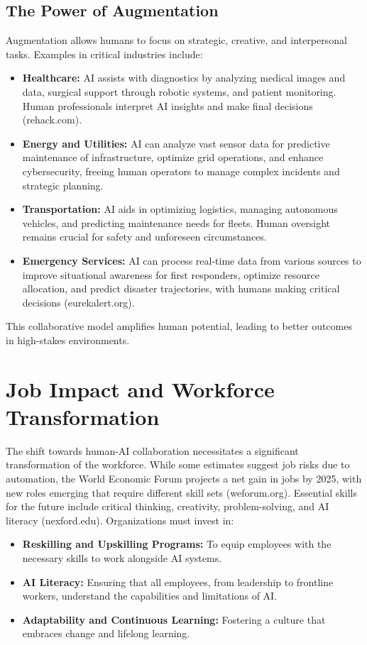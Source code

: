 \subsection{The Power of Augmentation}
Augmentation allows humans to focus on strategic, creative, and interpersonal tasks. Examples in critical industries include:
\begin{itemize}
    \item \textbf{Healthcare:} AI assists with diagnostics by analyzing medical images and data, surgical support through robotic systems, and patient monitoring. Human professionals interpret AI insights and make final decisions (rehack.com).
    \item \textbf{Energy and Utilities:} AI can analyze vast sensor data for predictive maintenance of infrastructure, optimize grid operations, and enhance cybersecurity, freeing human operators to manage complex incidents and strategic planning.
    \item \textbf{Transportation:} AI aids in optimizing logistics, managing autonomous vehicles, and predicting maintenance needs for fleets. Human oversight remains crucial for safety and unforeseen circumstances.
    \item \textbf{Emergency Services:} AI can process real-time data from various sources to improve situational awareness for first responders, optimize resource allocation, and predict disaster trajectories, with humans making critical decisions (eurekalert.org).
\end{itemize}
This collaborative model amplifies human potential, leading to better outcomes in high-stakes environments.

\section{Job Impact and Workforce Transformation}
The shift towards human-AI collaboration necessitates a significant transformation of the workforce. While some estimates suggest job risks due to automation, the World Economic Forum projects a net gain in jobs by 2025, with new roles emerging that require different skill sets (weforum.org). Essential skills for the future include critical thinking, creativity, problem-solving, and AI literacy (nexford.edu). Organizations must invest in:
\begin{itemize}
    \item \textbf{Reskilling and Upskilling Programs:} To equip employees with the necessary skills to work alongside AI systems.
    \item \textbf{AI Literacy:} Ensuring that all employees, from leadership to frontline workers, understand the capabilities and limitations of AI.
    \item \textbf{Adaptability and Continuous Learning:} Fostering a culture that embraces change and lifelong learning.
\end{itemize}

